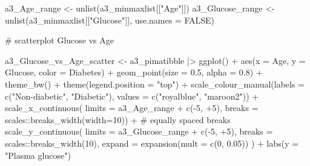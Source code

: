 \documentclass[
  english,
  11pt,
]{article}
\newenvironment{Shaded}{\begin{snugshade}}{\end{snugshade}}
\newcommand{\AttributeTok}[1]{\textcolor[rgb]{0.40,0.45,0.13}{#1}}
\newcommand{\CommentTok}[1]{\textcolor[rgb]{0.37,0.37,0.37}{#1}}
\newcommand{\ConstantTok}[1]{\textcolor[rgb]{0.56,0.35,0.01}{#1}}
\newcommand{\DecValTok}[1]{\textcolor[rgb]{0.68,0.00,0.00}{#1}}
\newcommand{\FloatTok}[1]{\textcolor[rgb]{0.68,0.00,0.00}{#1}}
\newcommand{\FunctionTok}[1]{\textcolor[rgb]{0.28,0.35,0.67}{#1}}
\newcommand{\NormalTok}[1]{\textcolor[rgb]{0.00,0.23,0.31}{#1}}
\newcommand{\OtherTok}[1]{\textcolor[rgb]{0.00,0.23,0.31}{#1}}
\newcommand{\SpecialCharTok}[1]{\textcolor[rgb]{0.37,0.37,0.37}{#1}}
\newcommand{\StringTok}[1]{\textcolor[rgb]{0.13,0.47,0.30}{#1}}
\begin{document}
\begin{Shaded}
\begin{Highlighting}[]
\NormalTok{a3\_Age\_range }\OtherTok{\textless{}{-}} \FunctionTok{unlist}\NormalTok{(a3\_minmaxlist[[}\StringTok{"Age"}\NormalTok{]])}
\NormalTok{a3\_Glucose\_range }\OtherTok{\textless{}{-}} \FunctionTok{unlist}\NormalTok{(a3\_minmaxlist[[}\StringTok{"Glucose"}\NormalTok{]], }\AttributeTok{use.names =} \ConstantTok{FALSE}\NormalTok{)}

\CommentTok{\# scatterplot Glucose vs Age}

\NormalTok{a3\_Glucose\_vs\_Age\_scatter }\OtherTok{\textless{}{-}}
\NormalTok{  a3\_pimatibble }\SpecialCharTok{|\textgreater{}}
  \FunctionTok{ggplot}\NormalTok{() }\SpecialCharTok{+}
  \FunctionTok{aes}\NormalTok{(}\AttributeTok{x =}\NormalTok{ Age, }\AttributeTok{y =}\NormalTok{ Glucose, }\AttributeTok{color =}\NormalTok{ Diabetes) }\SpecialCharTok{+}
  \FunctionTok{geom\_point}\NormalTok{(}\AttributeTok{size =} \FloatTok{0.5}\NormalTok{, }\AttributeTok{alpha =} \FloatTok{0.8}\NormalTok{) }\SpecialCharTok{+}
  \FunctionTok{theme\_bw}\NormalTok{() }\SpecialCharTok{+}
  \FunctionTok{theme}\NormalTok{(}\AttributeTok{legend.position =} \StringTok{"top"}\NormalTok{) }\SpecialCharTok{+}
  \FunctionTok{scale\_colour\_manual}\NormalTok{(}\AttributeTok{labels =} \FunctionTok{c}\NormalTok{(}\StringTok{"Non{-}diabetic"}\NormalTok{, }\StringTok{"Diabetic"}\NormalTok{),}
                      \AttributeTok{values =} \FunctionTok{c}\NormalTok{(}\StringTok{"royalblue"}\NormalTok{, }\StringTok{"maroon2"}\NormalTok{)) }\SpecialCharTok{+}
  \FunctionTok{scale\_x\_continuous}\NormalTok{(}
    \AttributeTok{limits =}\NormalTok{ a3\_Age\_range }\SpecialCharTok{+} \FunctionTok{c}\NormalTok{(}\SpecialCharTok{{-}}\DecValTok{5}\NormalTok{, }\SpecialCharTok{+}\DecValTok{5}\NormalTok{),}
    \AttributeTok{breaks =}\NormalTok{ scales}\SpecialCharTok{::}\FunctionTok{breaks\_width}\NormalTok{(}\AttributeTok{width=}\DecValTok{10}\NormalTok{)) }\SpecialCharTok{+} \CommentTok{\# equally spaced breaks}
  \FunctionTok{scale\_y\_continuous}\NormalTok{(}
    \AttributeTok{limits =}\NormalTok{ a3\_Glucose\_range }\SpecialCharTok{+} \FunctionTok{c}\NormalTok{(}\SpecialCharTok{{-}}\DecValTok{5}\NormalTok{, }\SpecialCharTok{+}\DecValTok{5}\NormalTok{),}
    \AttributeTok{breaks =}\NormalTok{ scales}\SpecialCharTok{::}\FunctionTok{breaks\_width}\NormalTok{(}\DecValTok{10}\NormalTok{),}
    \AttributeTok{expand =} \FunctionTok{expansion}\NormalTok{(}\AttributeTok{mult =} \FunctionTok{c}\NormalTok{(}\DecValTok{0}\NormalTok{, }\FloatTok{0.05}\NormalTok{))}
\NormalTok{  ) }\SpecialCharTok{+}
  \FunctionTok{labs}\NormalTok{(}\AttributeTok{y =} \StringTok{"Plasma glucose"}\NormalTok{)}


\end{Highlighting}
\end{Shaded}
\end{document}
